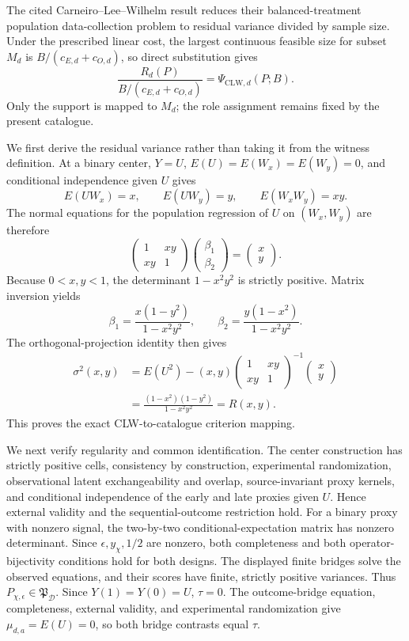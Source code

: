 The cited Carneiro--Lee--Wilhelm result reduces their balanced-treatment population data-collection problem to residual variance divided by sample size. Under the prescribed linear cost, the largest continuous feasible size for subset \(M_d\) is \(B/(c_{E,d}+c_{O,d})\), so direct substitution gives
\[
 \frac{R_d(P)}{B/(c_{E,d}+c_{O,d})}
 =\Psi_{\mathrm{CLW},d}(P;B).                              \tag{1}
\]
Only the support is mapped to \(M_d\); the role assignment remains fixed by the present catalogue.

We first derive the residual variance rather than taking it from the witness definition. At a binary center, \(Y=U\), \(E(U)=E(W_x)=E(W_y)=0\), and conditional independence given \(U\) gives
\[
 E(UW_x)=x,\qquad E(UW_y)=y,\qquad E(W_xW_y)=xy.
\]
The normal equations for the population regression of \(U\) on \((W_x,W_y)\) are therefore
\[
 \begin{pmatrix}1&xy\\xy&1\end{pmatrix}
 \begin{pmatrix}\beta_1\\\beta_2\end{pmatrix}
 =\begin{pmatrix}x\\y\end{pmatrix}.
\]
Because \(0<x,y<1\), the determinant \(1-x^2y^2\) is strictly positive. Matrix inversion yields
\[
 \beta_1=\frac{x(1-y^2)}{1-x^2y^2},
 \qquad
 \beta_2=\frac{y(1-x^2)}{1-x^2y^2}.                       \tag{2}
\]
The orthogonal-projection identity then gives
\[
\begin{aligned}
 \sigma^2(x,y)
 &=E(U^2)-(x,y)
 \begin{pmatrix}1&xy\\xy&1\end{pmatrix}^{-1}
 \begin{pmatrix}x\\y\end{pmatrix}\\
 &=\frac{(1-x^2)(1-y^2)}{1-x^2y^2}=R(x,y).                \tag{3}
\end{aligned}
\]
This proves the exact CLW-to-catalogue criterion mapping.

We next verify regularity and common identification. The center construction has strictly positive cells, consistency by construction, experimental randomization, observational latent exchangeability and overlap, source-invariant proxy kernels, and conditional independence of the early and late proxies given \(U\). Hence external validity and the sequential-outcome restriction hold. For a binary proxy with nonzero signal, the two-by-two conditional-expectation matrix has nonzero determinant. Since \(\epsilon,y_\chi,1/2\) are nonzero, both completeness and both operator-bijectivity conditions hold for both designs. The displayed finite bridges solve the observed equations, and their scores have finite, strictly positive variances. Thus \(P_{\chi,\epsilon}\in\mathfrak P_{\mathcal D}\). Since \(Y(1)=Y(0)=U\), \(\tau=0\). The outcome-bridge equation, completeness, external validity, and experimental randomization give \(\mu_{d,a}=E(U)=0\), so both bridge contrasts equal \(\tau\).

